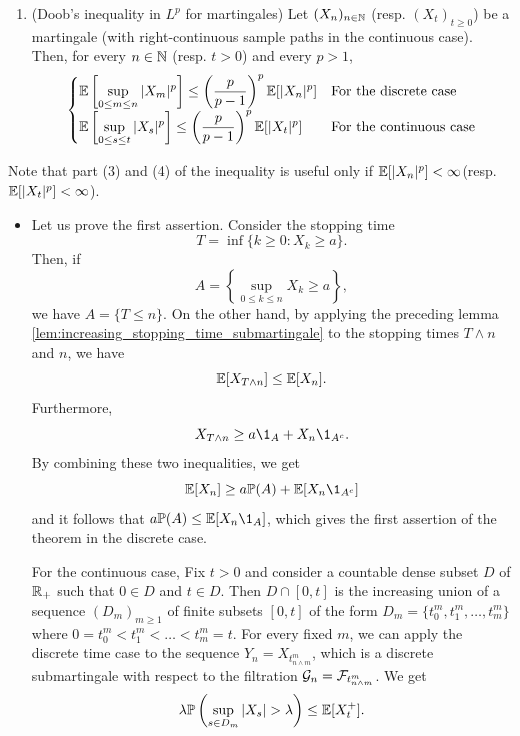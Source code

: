 \documentclass[../Main.tex]{subfiles}
\begin{document}
{\begin{enumerate}
    \[
    \begin{cases}
        \displaystyle \EE\left[ \sup_{0 \leq m \leq n} X_m^p \right] \leq \left( \frac{p}{p - 1} \right)^p \EE[|X_n|^p] & \text{For the discrete case} \\
        \displaystyle \EE\left[ \sup_{0 \leq s \leq t} X_s^p \right] \leq \left( \frac{p}{p - 1} \right)^p \EE[|X_t|^p] & \text{For the continuous case} \\
    \end{cases}
    \]
    \item (Doob's inequality in $L^p$ for martingales) Let  $(X_n)_{n\in\mathbb{N}}$ (resp. $(X_t)_{t \geq 0}$) be a martingale (with right-continuous sample paths in the continuous case). Then, for every $n\in\mathbb{N}$ (resp. $t > 0$) and every $p > 1$,
    \[
    \begin{cases}
        \displaystyle \mathbb{E}\left[ \sup_{0 \leq m \leq n} |X_m|^p \right] \leq \left( \frac{p}{p - 1} \right)^p \mathbb{E}[|X_n|^p] & \text{For the discrete case} \\
        \displaystyle \mathbb{E}\left[ \sup_{0 \leq s \leq t} |X_s|^p \right] \leq \left( \frac{p}{p - 1} \right)^p \mathbb{E}[|X_t|^p] & \text{For the continuous case} \\
    \end{cases}
    \]
\end{enumerate}
Note that part (3) and (4) of the inequality is useful only if $\mathbb{E}[|X_n|^p] < \infty$(resp. $\mathbb{E}[|X_t|^p] < \infty$).
}{
\begin{itemize}
    \item Let us prove the first assertion. Consider the stopping time
    \[T = \inf\{k \geq 0 : X_k \geq a\}.\]
    Then, if
    \[ A = \left\{ \sup_{0 \leq k \leq n} X_k \geq a \right\}, \]
    we have $A = \{T \leq n\}$. On the other hand, by applying the preceding lemma \ref{lem:increasing_stopping_time_submartingale} to the stopping times $T \wedge n$ and $n$, we have
    \[ \mathbb{E}[X_{T \wedge n}] \leq \mathbb{E}[X_n]. \]
    Furthermore,
    \[ X_{T \wedge n} \geq a \1_A + X_n \1_{A^c}. \]
    By combining these two inequalities, we get
    \[ \EE[X_n] \geq a \PP(A) + \EE[X_n \1_{A^c}] \]
    and it follows that $a \PP(A) \leq \EE[X_n \1_A]$, which gives the first assertion of the theorem in the discrete case.   

    For the continuous case, Fix $t > 0$ and consider a countable dense subset $D$ of $\mathbb{R}_+$ such that $0 \in D$ and $t \in D$. Then $D \cap [0, t]$ is the increasing union of a sequence $(D_m)_{m \geq 1}$ of finite subsets $[0, t]$ of the form $D_m = \{t^m_0, t^m_1, \dots, t^m_m\}$ where $0 = t^m_0 < t^m_1 < \dots < t^m_m = t$. For every fixed $m$, we can apply the discrete time case to the sequence $Y_n = X_{t^m_{n \wedge m}}$, which is a discrete submartingale with respect to the filtration $\mathcal{G}_n = \mathcal{F}_{t^m_{n \wedge m}}$. We get
    \[ \lambda\mathbb{P}\left( \sup_{s \in D_m} |X_s| > \lambda \right) \leq  \mathbb{E}[X_t^+].\] 


\end{itemize}}
\end{document}
